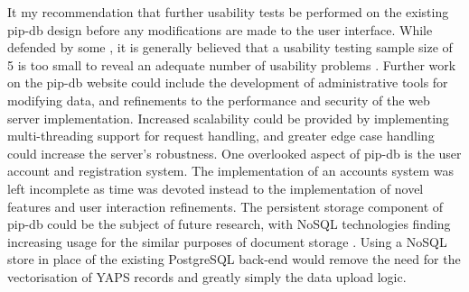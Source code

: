 It my recommendation that further usability tests be performed on the
existing pip-db design before any modifications are made to the user
interface. While defended by some \cite{nielsen2000you}, it is
generally believed that a usability testing sample size of 5 is too
small to reveal an adequate number of usability problems
\cite{spool2001testing, woolrych2001and}. Further work on the pip-db
website could include the development of administrative tools for
modifying data, and refinements to the performance and security of the
web server implementation. Increased scalability could be provided by
implementing multi-threading support for request handling, and greater
edge case handling could increase the server's robustness. One
overlooked aspect of pip-db is the user account and registration
system. The implementation of an accounts system was left incomplete
as time was devoted instead to the implementation of novel features
and user interaction refinements. The persistent storage component of
pip-db could be the subject of future research, with NoSQL
technologies finding increasing usage for the similar purposes of
document storage \cite{tudorica2011comparison, mongo2014leading,
  hecht2011nosql, mongo2013top5}. Using a NoSQL store in place of the
existing PostgreSQL back-end would remove the need for the
vectorisation of YAPS records and greatly simply the data upload
logic.
